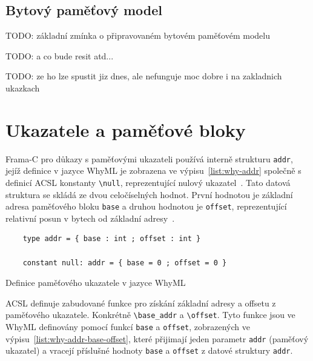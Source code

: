 \subsection{Bytový paměťový model}
\label{subsec:bytovy-pametovy-model}

TODO: základní zmínka o připravovaném bytovém paměťovém modelu

TODO: a co bude resit atd...

TODO: ze ho lze spustit jiz dnes, ale nefunguje moc dobre i na zakladnich ukazkach

\section{Ukazatele a paměťové bloky}
\label{sec:ukazatele-a-pametove-bloky}

Frama\mbox{-}C pro důkazy s paměťovými ukazateli používá interně strukturu \texttt{addr},
jejíž definice v jazyce WhyML je zobrazena ve výpisu~\ref{list:why-addr}
společně s definicí ACSL konstanty \texttt{\textbackslash null},
reprezentující nulový ukazatel~\cite{FCGitWhy}.
Tato datová struktura se skládá ze dvou celočíselných hodnot.
První hodnotou je základní adresa paměťového bloku \texttt{base}
a druhou hodnotou je \texttt{offset}, reprezentující relativní posun v bytech od základní adresy~\cite{BlanchardWP2024}.


\begin{listing}[H]
    \begin{verbatim}
    type addr = { base : int ; offset : int }

    constant null: addr = { base = 0 ; offset = 0 }
    \end{verbatim}
    \caption{Definice paměťového ukazatele v jazyce WhyML}
    \label{list:why-addr}
\end{listing}

ACSL definuje zabudované funkce pro získání základní adresy a offsetu z paměťového ukazatele.
Konkrétně \texttt{\textbackslash base\_addr} a \texttt{\textbackslash offset}.
Tyto funkce jsou ve WhyML definovány pomocí funkcí \texttt{base} a \texttt{offset},
zobrazených ve výpisu~\ref{list:why-addr-base-offset},
které přijimají jeden parametr \texttt{addr} (paměťový ukazatel)
a vracejí příslušné hodnoty \texttt{base} a \texttt{offset} z datové struktury \texttt{addr}.

